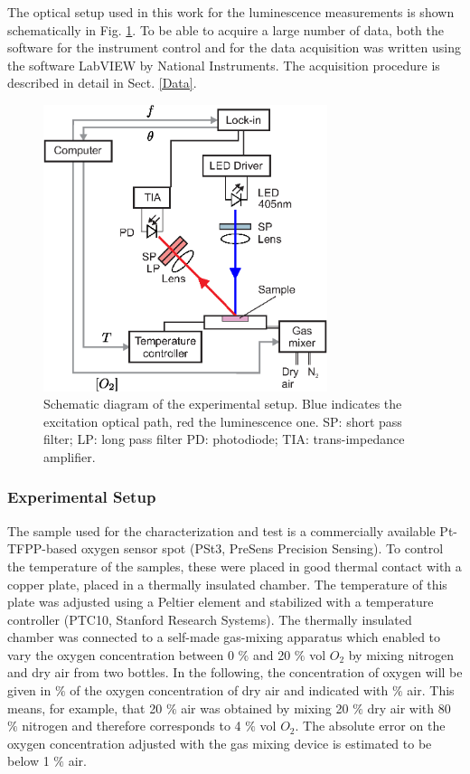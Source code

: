 \documentclass[9pt,twocolumn,twoside,pdftex]{optica}
\begin{document}
The optical setup used in this work for the luminescence measurements is shown schematically in Fig. \ref{fig:setup}. To be able to acquire a large number of data, both the software for the instrument control and for the data acquisition was written using the software LabVIEW by National Instruments. The acquisition procedure is described in detail in Sect. \ref{Data}.

\begin{figure}[t!]
\centering
\includegraphics[keepaspectratio, width=8.3cm]{Setup_auto.eps}
\caption{Schematic diagram of the experimental setup. Blue indicates the excitation optical path, red the luminescence one. SP: short pass filter; LP: long pass filter PD: photodiode; TIA: trans-impedance amplifier.}
\label{fig:setup}
\end{figure}


\subsubsection{Experimental Setup}

The sample used for the characterization and test is a commercially available Pt-TFPP-based oxygen sensor spot (PSt3, PreSens Precision Sensing).
To control the temperature of the samples, these were placed in good thermal contact with a copper plate, placed in a thermally insulated chamber. The temperature of this plate was adjusted using a Peltier element and stabilized with a temperature controller (PTC10, Stanford Research Systems). The thermally insulated chamber was connected to a self-made gas-mixing apparatus which enabled to vary the oxygen concentration between 0 $\%$ and 20 $\%$ vol $O_2$ by mixing nitrogen and dry air from two bottles. In the following, the concentration of oxygen will be given in $\%$ of the oxygen concentration of dry air and indicated with $\%$ air. This means, for example, that 20 $\%$ air was obtained by mixing 20 $\%$ dry air with 80 $\%$ nitrogen and therefore corresponds to 4 $\%$ vol $O_2$. The absolute error on the oxygen concentration adjusted with the gas mixing device is estimated to be below 1 $\%$ air. 
 
\end{document}
